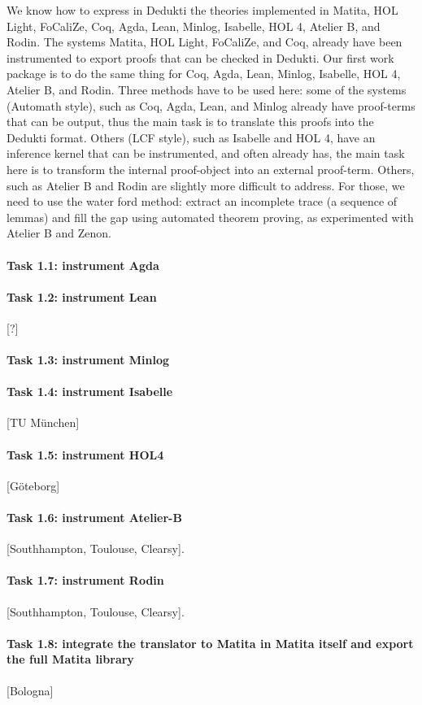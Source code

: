 We know how to express in Dedukti the theories implemented in Matita,
HOL Light, FoCaliZe, Coq, Agda, Lean, Minlog, Isabelle, HOL 4,
Atelier B, and Rodin. The systems Matita, HOL Light, FoCaliZe, and
Coq, already have been instrumented to export proofs that can be
checked in Dedukti. Our first work package is to do the same thing for
Coq, Agda, Lean, Minlog, Isabelle, HOL 4, Atelier B, and
Rodin. Three methods have to be used here: some of the systems
(Automath style), such as Coq, Agda, Lean, and Minlog already have
proof-terms that can be output, thus the main task is to translate
this proofs into the Dedukti format. Others (LCF style), such as
Isabelle and HOL 4, have an inference kernel that can be
instrumented, and often already has, the main task here is to transform
the internal proof-object into an external proof-term. Others, such as
Atelier B and Rodin are slightly more difficult to address. For those,
we need to use the water ford method: extract an incomplete trace (a
sequence of lemmas) and fill the gap using automated theorem proving,
as experimented with Atelier B and Zenon.


\paragraph{Task 1.1: instrument Agda}



\paragraph{Task 1.2: instrument Lean}

[?]

\paragraph{Task 1.3: instrument Minlog}



\paragraph{Task 1.4: instrument Isabelle}

[TU München]

\paragraph{Task 1.5: instrument HOL4}

[G\"oteborg]

\paragraph{Task 1.6: instrument Atelier-B}

[Southhampton, Toulouse, Clearsy].

\paragraph{Task 1.7: instrument Rodin}

[Southhampton, Toulouse, Clearsy].

\paragraph{Task 1.8: integrate the translator to Matita in Matita itself and export the full Matita library}

[Bologna]

